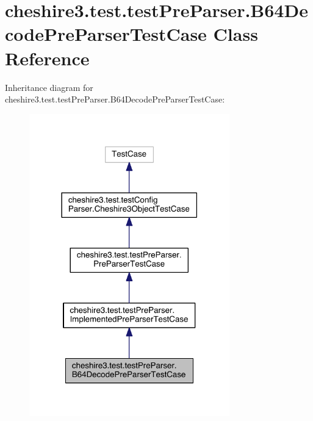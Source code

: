 \hypertarget{classcheshire3_1_1test_1_1test_pre_parser_1_1_b64_decode_pre_parser_test_case}{\section{cheshire3.\-test.\-test\-Pre\-Parser.\-B64\-Decode\-Pre\-Parser\-Test\-Case Class Reference}
\label{classcheshire3_1_1test_1_1test_pre_parser_1_1_b64_decode_pre_parser_test_case}
}


Inheritance diagram for cheshire3.\-test.\-test\-Pre\-Parser.\-B64\-Decode\-Pre\-Parser\-Test\-Case\-:
\nopagebreak
\begin{figure}[H]
\begin{center}
\leavevmode
\includegraphics[width=246pt]{classcheshire3_1_1test_1_1test_pre_parser_1_1_b64_decode_pre_parser_test_case__inherit__graph}
\end{center}
\end{figure}



